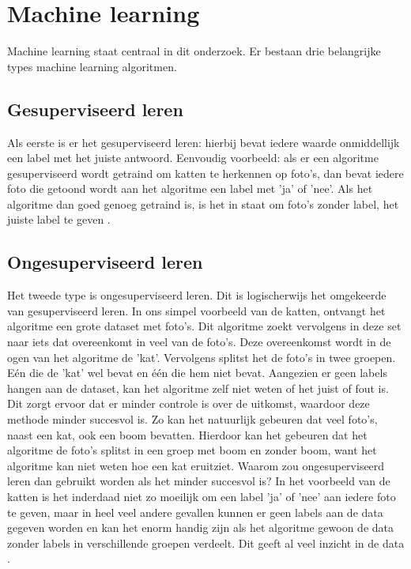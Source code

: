 \section{Machine learning}
Machine learning staat centraal in dit onderzoek. Er bestaan drie belangrijke types machine learning algoritmen.

\subsection{Gesuperviseerd leren}
Als eerste is er het gesuperviseerd leren: hierbij bevat iedere waarde onmiddellijk een label met het juiste antwoord. Eenvoudig voorbeeld: als er een algoritme gesuperviseerd wordt getraind om katten te herkennen op foto's, dan bevat iedere foto die getoond wordt aan het algoritme een label met 'ja' of 'nee'. Als het algoritme dan goed genoeg getraind is, is het in staat om foto's zonder label, het juiste label te geven \autocite{Postma2019}.
\\\indent
\subsection{Ongesuperviseerd leren}
Het tweede type is ongesuperviseerd leren. Dit is logischerwijs het omgekeerde van gesuperviseerd leren. In ons simpel voorbeeld van de katten, ontvangt het algoritme een grote dataset met foto's. Dit algoritme zoekt vervolgens in deze set naar iets dat overeenkomt in veel van de foto's. Deze overeenkomst wordt in de ogen van het algoritme de 'kat'. Vervolgens splitst het de foto's in twee groepen. Eén die de 'kat' wel bevat en één die hem niet bevat. Aangezien er geen labels hangen aan de dataset, kan het algoritme zelf niet weten of het juist of fout is. Dit zorgt ervoor dat er minder controle is over de uitkomst, waardoor deze methode minder succesvol is. Zo kan het natuurlijk gebeuren dat veel foto's, naast een kat, ook een boom bevatten. Hierdoor kan het gebeuren dat het algoritme de foto's splitst in een groep met boom en zonder boom, want het algoritme kan niet weten hoe een kat eruitziet. Waarom zou ongesuperviseerd leren dan gebruikt worden als het minder succesvol is? In het voorbeeld van de katten is het inderdaad niet zo moeilijk om een label 'ja' of 'nee' aan iedere foto te geven, maar in heel veel andere gevallen kunnen er geen labels aan de data gegeven worden en kan het enorm handig zijn als het algoritme gewoon de data zonder labels in verschillende groepen verdeelt. Dit geeft al veel inzicht in de data \autocite{Postma2019}.

